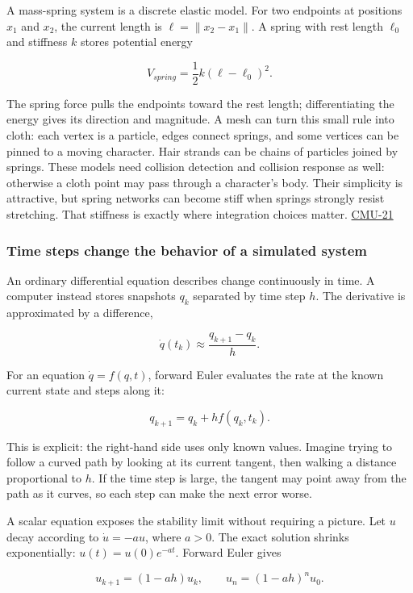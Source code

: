 A mass-spring system is a discrete elastic model. For two endpoints at positions \(x_1\) and \(x_2\), the current length is \(\ell=\|x_2-x_1\|\). A spring with rest length \(\ell_0\) and stiffness \(k\) stores potential energy

\[
V_{spring}=\frac12 k(\ell-\ell_0)^2.
\]

The spring force pulls the endpoints toward the rest length; differentiating the energy gives its direction and magnitude. A mesh can turn this small rule into cloth: each vertex is a particle, edges connect springs, and some vertices can be pinned to a moving character. Hair strands can be chains of particles joined by springs. These models need collision detection and collision response as well: otherwise a cloth point may pass through a character's body. Their simplicity is attractive, but spring networks can become stiff when springs strongly resist stretching. That stiffness is exactly where integration choices matter. \hyperref[04-visual-computing-ii-ch036]{CMU-21}

\subsubsection{Time steps change the behavior of a simulated system}\label{time-steps-change-the-behavior-of-a-simulated-system}

An ordinary differential equation describes change continuously in time. A computer instead stores snapshots \(q_k\) separated by time step \(h\). The derivative is approximated by a difference,

\[
\dot q(t_k)\approx\frac{q_{k+1}-q_k}{h}.
\]

For an equation \(\dot q=f(q,t)\), forward Euler evaluates the rate at the known current state and steps along it:

\[
q_{k+1}=q_k+h f(q_k,t_k).
\]

This is explicit: the right-hand side uses only known values. Imagine trying to follow a curved path by looking at its current tangent, then walking a distance proportional to \(h\). If the time step is large, the tangent may point away from the path as it curves, so each step can make the next error worse.

A scalar equation exposes the stability limit without requiring a picture. Let \(u\) decay according to \(\dot u=-a u\), where \(a>0\). The exact solution shrinks exponentially: \(u(t)=u(0)e^{-at}\). Forward Euler gives

\[
u_{k+1}=(1-ah)u_k,
\qquad
u_n=(1-ah)^n u_0.
\]

